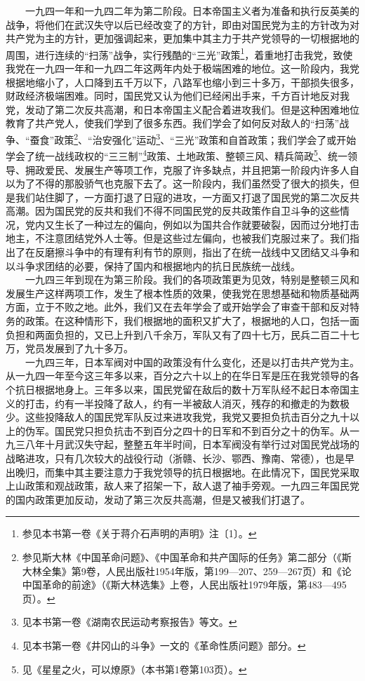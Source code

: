 \documentclass[cn,11pt,chinese]{elegantbook}
\begin{document}
　　一九四一年和一九四二年为第二阶段。日本帝国主义者为准备和执行反英美的战争，将他们在武汉失守以后已经改变了的方针，即由对国民党为主的方针改为对共产党为主的方针，更加强调起来，更加集中其主力于共产党领导的一切根据地的周围，进行连续的“扫荡”战争，实行残酷的“三光”政策\footnote[14]{ 参见本书第一卷《关于蒋介石声明的声明》注〔1〕。}，着重地打击我党，致使我党在一九四一年和一九四二年这两年内处于极端困难的地位。这一阶段内，我党根据地缩小了，人口降到五千万以下，八路军也缩小到三十多万，干部损失很多，财政经济极端困难。同时，国民党又认为他们已经闲出手来，千方百计地反对我党，发动了第二次反共高潮，和日本帝国主义配合着进攻我们。但是这种困难地位教育了共产党人，使我们学到了很多东西。我们学会了如何反对敌人的“扫荡”战争、“蚕食”政策\footnote[15]{ 参见斯大林《中国革命问题》、《中国革命和共产国际的任务》第二部分（《斯大林全集》第9卷，人民出版社1954年版，第199—207、259—267页）和《论中国革命的前途》（《斯大林选集》上卷，人民出版社1979年版，第483—495页）。}、“治安强化”运动\footnote[16]{ 见本书第一卷《湖南农民运动考察报告》等文。}、“三光”政策和自首政策；我们学会了或开始学会了统一战线政权的“三三制”\footnote[17]{ 见本书第一卷《井冈山的斗争》一文的《革命性质问题》部分。}政策、土地政策、整顿三风、精兵简政\footnote[18]{ 见《星星之火，可以燎原》（本书第1卷第103页）。}、统一领导、拥政爱民、发展生产等项工作，克服了许多缺点，并且把第一阶段内许多人自以为了不得的那股骄气也克服下去了。这一阶段内，我们虽然受了很大的损失，但是我们站住脚了，一方面打退了日寇的进攻，一方面又打退了国民党的第二次反共高潮。因为国民党的反共和我们不得不同国民党的反共政策作自卫斗争的这些情况，党内又生长了一种过左的偏向，例如以为国共合作就要破裂，因而过分地打击地主，不注意团结党外人士等。但是这些过左偏向，也被我们克服过来了。我们指出了在反磨擦斗争中的有理有利有节的原则，指出了在统一战线中又团结又斗争和以斗争求团结的必要，保持了国内和根据地内的抗日民族统一战线。\\
　　一九四三年到现在为第三阶段。我们的各项政策更为见效，特别是整顿三风和发展生产这样两项工作，发生了根本性质的效果，使我党在思想基础和物质基础两方面，立于不败之地。此外，我们又在去年学会了或开始学会了审查干部和反对特务的政策。在这种情形下，我们根据地的面积又扩大了，根据地的人口，包括一面负担和两面负担的，又已上升到八千余万，军队又有了四十七万，民兵二百二十七万，党员发展到了九十多万。\\
　　一九四三年，日本军阀对中国的政策没有什么变化，还是以打击共产党为主。从一九四一年至今这三年多以来，百分之六十以上的在华日军是压在我党领导的各个抗日根据地身上。三年多以来，国民党留在敌后的数十万军队经不起日本帝国主义的打击，约有一半投降了敌人，约有一半被敌人消灭，残存的和撤走的为数极少。这些投降敌人的国民党军队反过来进攻我党，我党又要担负抗击百分之九十以上的伪军。国民党只担负抗击不到百分之四十的日军和不到百分之十的伪军。从一九三八年十月武汉失守起，整整五年半时间，日本军阀没有举行过对国民党战场的战略进攻，只有几次较大的战役行动（浙赣、长沙、鄂西、豫南、常德），也是早出晚归，而集中其主要注意力于我党领导的抗日根据地。在此情况下，国民党采取上山政策和观战政策，敌人来了招架一下，敌人退了袖手旁观。一九四三年国民党的国内政策更加反动，发动了第三次反共高潮，但是又被我们打退了。\\
\end{document}
